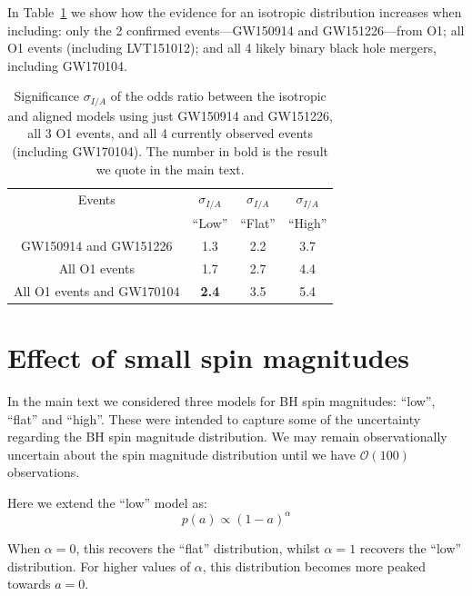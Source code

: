 \documentclass{nature-arxiv}
\begin{document}
\begin{methods}
In Table~\ref{tab:accumulation} we show how the evidence for an isotropic distribution increases when including: only the 2 confirmed events---GW150914 and GW151226---from O1; all O1 events (including LVT151012); and all 4 likely binary black hole mergers, including GW170104. 

\begin{table}
\begin{centering}
\begin{tabular}{ c |  c  |  c  | c  }
  \hline 
  \hline
Events & $\sigma_{I/A}$ &  $\sigma_{I/A}$ & $\sigma_{I/A}$ \\ 
 & ``Low'' & ``Flat'' & ``High'' \\ \hline
GW150914 and GW151226 &  1.3 & 2.2 & 3.7 \\ %
All O1 events & 1.7 & 2.7 & 4.4 \\ %
All O1 events and GW170104 & \textbf{2.4} & 3.5 & 5.4 \\ \hline
\end{tabular}
\caption[]{Significance $\sigma_{I/A}$ of the odds ratio between the isotropic and aligned models using just GW150914 and GW151226, all 3 O1 events, and all 4 currently observed events (including GW170104). The number in bold is the result we quote in the main text.}
\label{tab:accumulation}
\end{centering}
\end{table}


\section{Effect of small spin magnitudes}
\label{sec:smallspins}

In the main text we considered three models for BH spin magnitudes:
``low'', ``flat'' and ``high''. These were intended to capture some of
the uncertainty regarding the BH spin magnitude distribution.  We may
remain observationally uncertain about the spin magnitude distribution
until we have $\mathcal{O}(100)$
observations\cite{2017arXiv170306869F,2017arXiv170306223G}.

Here we extend the ``low'' model as:
%
\begin{equation}
p(a) \propto (1 - a)^{\alpha}
\label{eq:lowspinalpha}
\end{equation}
%

When $\alpha = 0$, this recovers the ``flat'' distribution, whilst
$\alpha = 1$ recovers the ``low'' distribution. For higher values of
$\alpha$, this distribution becomes more peaked towards
$a = 0$.


\end{methods}
\end{document}
